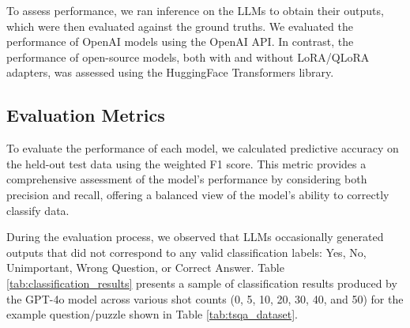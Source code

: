 \documentclass[conference]{IEEEtran}
\begin{document}
To assess performance, we ran inference on the LLMs to obtain their outputs, which were then evaluated against the ground truths. We evaluated the performance of OpenAI models using the OpenAI API.
In contrast, the performance of open-source models, both with and without LoRA/QLoRA adapters, was assessed using the HuggingFace Transformers library\cite{wolf2020transformers}.

\subsection{Evaluation Metrics}

To evaluate the performance of each model, we calculated predictive accuracy on the held-out test data using the weighted F1 score. This metric provides a comprehensive assessment of the model’s performance by considering both precision and recall, offering a balanced view of the model's ability to correctly classify data.

During the evaluation process, we observed that LLMs occasionally generated outputs that did not correspond to any valid classification labels: Yes, No, Unimportant, Wrong Question, or Correct Answer. Table \ref{tab:classification_results} presents a sample of classification results produced by the GPT-4o model across various shot counts (0, 5, 10, 20, 30, 40, and 50) for the example question/puzzle shown in Table \ref{tab:tsqa_dataset}.
\end{document}
